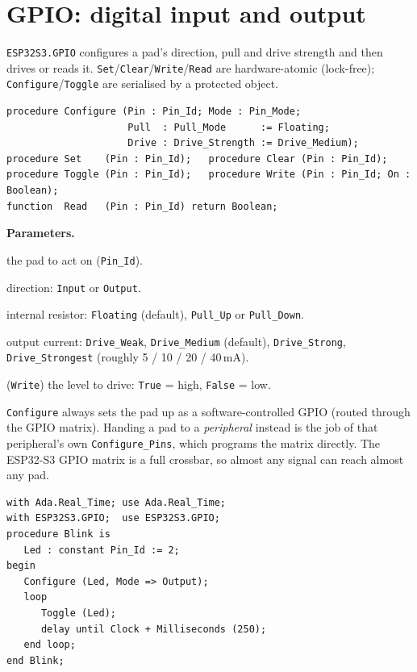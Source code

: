 \section{GPIO: digital input and output}

\texttt{ESP32S3.GPIO} configures a pad's direction, pull and drive strength and
then drives or reads it. \texttt{Set}/\texttt{Clear}/\texttt{Write}/\texttt{Read}
are hardware-atomic (lock-free); \texttt{Configure}/\texttt{Toggle} are serialised
by a protected object.

\begin{lstlisting}
procedure Configure (Pin : Pin_Id; Mode : Pin_Mode;
                     Pull  : Pull_Mode      := Floating;
                     Drive : Drive_Strength := Drive_Medium);
procedure Set    (Pin : Pin_Id);   procedure Clear (Pin : Pin_Id);
procedure Toggle (Pin : Pin_Id);   procedure Write (Pin : Pin_Id; On : Boolean);
function  Read   (Pin : Pin_Id) return Boolean;
\end{lstlisting}

\textbf{Parameters.}
\begin{description}[style=nextline]
\item[\texttt{Pin}] the pad to act on (\texttt{Pin\_Id}).
\item[\texttt{Mode}] direction: \texttt{Input} or \texttt{Output}.
\item[\texttt{Pull}] internal resistor: \texttt{Floating} (default), \texttt{Pull\_Up}
  or \texttt{Pull\_Down}.
\item[\texttt{Drive}] output current: \texttt{Drive\_Weak}, \texttt{Drive\_Medium}
  (default), \texttt{Drive\_Strong}, \texttt{Drive\_Strongest} (roughly
  5 / 10 / 20 / 40\,mA).
\item[\texttt{On}] (\texttt{Write}) the level to drive: \texttt{True} = high,
  \texttt{False} = low.
\end{description}

\texttt{Configure} always sets the pad up as a software-controlled GPIO (routed
through the GPIO matrix). Handing a pad to a \emph{peripheral} instead is the job
of that peripheral's own \texttt{Configure\_Pins}, which programs the matrix
directly. The ESP32-S3 GPIO matrix is a full crossbar, so almost any signal
can reach almost any pad.

\begin{lstlisting}
with Ada.Real_Time; use Ada.Real_Time;
with ESP32S3.GPIO;  use ESP32S3.GPIO;
procedure Blink is
   Led : constant Pin_Id := 2;
begin
   Configure (Led, Mode => Output);
   loop
      Toggle (Led);
      delay until Clock + Milliseconds (250);
   end loop;
end Blink;
\end{lstlisting}


